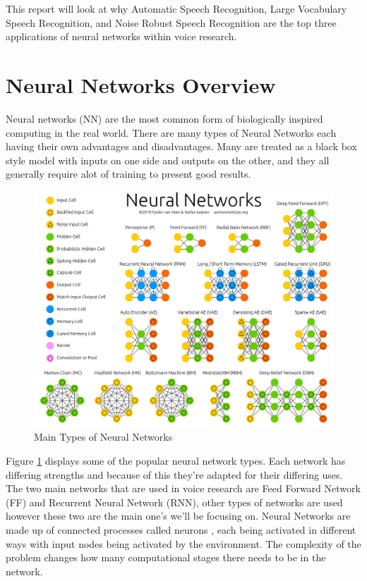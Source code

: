 \documentclass[11pt]{article}
\begin{document}
    This report will look at why Automatic Speech Recognition, Large Vocabulary Speech Recognition, and Noise Robust Speech Recognition are the top three applications of neural networks within voice research.
    
    \section{Neural Networks Overview}
    Neural networks (NN) are the most common form of biologically inspired computing in the real world. There are many types of Neural Networks each having their own advantages and disadvantages. Many are treated as a black box style model with inputs on one side and outputs on the other, and they all generally require alot of training to present good results.
    
    \begin{figure}[ht]
        \centering
        \includegraphics[scale=0.1]{NeuralNetwork.png}
        \caption{Main Types of Neural Networks \cite{Leijnen2020TheZoo}}
        \label{fig:neuralNetworks}
    \end{figure}
    
    Figure \ref{fig:neuralNetworks} displays some of the popular neural network types. Each network has differing strengths and because of this they're adapted for their differing uses. The two main networks that are used in voice research are Feed Forward Network (FF) and Recurrent Neural Network (RNN), other types of networks are used however these two are the main one's we'll be focusing on. Neural Networks are made up of connected processes called neurons \cite{Schmidhuber2015DeepOverview}, each being activated in different ways with input nodes being activated by the environment. The complexity of the problem changes how many computational stages there needs to be in the network.
    
\end{document}
